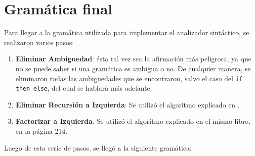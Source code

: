 \documentclass[a4paper,oneside]{report}
\begin{document}
\section{Gramática final}
Para llegar a la gramática utilizada para implementar el analizador sintáctico, se realizaron varios pasos:
\begin{enumerate}
	\item \textbf{Eliminar Ambiguedad}: ésta tal vez sea la afirmación más peligrosa, ya que no se puede saber si una gramática es ambigua o no. De cualquier manera, se eliminaron todas las ambiguedades que se encontraron, salvo el caso del \verb|if then else|, del cual se hablará más adelante.
	\item \textbf{Eliminar Recursión a Izquierda}: Se utilizó el algoritmo explicado en \cite[pág. 212]{aho}.
	\item \textbf{Factorizar a Izquierda}: Se utilizó el algoritmo explicado en el mismo libro, en la página 214.
\end{enumerate}
Luego de esta serie de pasos, se llegó a la siguiente gramática:
\end{document}
